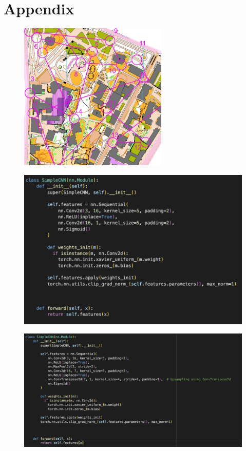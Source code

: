 \documentclass[a4paper,12pt]{extarticle}
\begin{document}

\newpage
\section{Appendix}

\begin{figure}[H]
    \centering
    \includegraphics[width=200pt]{hard_configuration.png}
    \label{fig:mapsample}
\end{figure}
\begin{figure}[H]
    \centering
    \includegraphics[width=\linewidth]{CNN simple model.png}
    \label{fig:simple-CNN}
\end{figure}
\begin{figure}[H]
    \centering
    \includegraphics[width=\linewidth]{CNN model pooling.png}
    \label{fig:pooling-CNN}
\end{figure}
\end{document}
